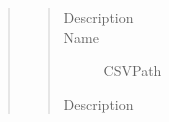 \documentclass[letterpaper,10pt,english]{sphinxmanual}
\begin{document}
\begin{quote}
\begin{description}
\begin{quote}
\begin{description}
\item[{Description}] \leavevmode
{}

\item[{Name}] \leavevmode
CSVPath

\item[{Description}] \leavevmode
{}

\end{description}\end{quote}

\end{description}\end{quote}
\end{document}
